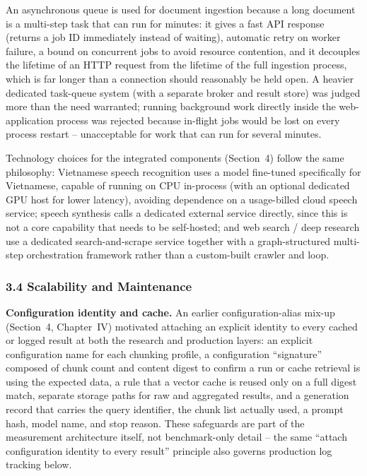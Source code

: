 \documentclass[11pt,a4paper]{article}
\begin{document}
An asynchronous queue is used for document ingestion because a long
document is a multi-step task that can run for minutes: it gives a fast API
response (returns a job ID immediately instead of waiting), automatic retry
on worker failure, a bound on concurrent jobs to avoid resource contention,
and it decouples the lifetime of an HTTP request from the lifetime of the
full ingestion process, which is far longer than a connection should
reasonably be held open. A heavier dedicated task-queue system (with a
separate broker and result store) was judged more than the need warranted;
running background work directly inside the web-application process was
rejected because in-flight jobs would be lost on every process restart --
unacceptable for work that can run for several minutes.

Technology choices for the integrated components (Section~4) follow the
same philosophy: Vietnamese speech recognition uses a model fine-tuned
specifically for Vietnamese, capable of running on CPU in-process (with an
optional dedicated GPU host for lower latency), avoiding dependence on a
usage-billed cloud speech service; speech synthesis calls a dedicated
external service directly, since this is not a core capability that needs
to be self-hosted; and web search / deep research use a dedicated
search-and-scrape service together with a graph-structured multi-step
orchestration framework rather than a custom-built crawler and loop.

\subsubsection{3.4 Scalability and Maintenance}

\textbf{Configuration identity and cache.} An earlier configuration-alias
mix-up (Section~4, Chapter~IV) motivated attaching an explicit identity to
every cached or logged result at both the research and production layers:
an explicit configuration name for each chunking profile, a configuration
``signature'' composed of chunk count and content digest to confirm a run or
cache retrieval is using the expected data, a rule that a vector cache is
reused only on a full digest match, separate storage paths for raw and
aggregated results, and a generation record that carries the query
identifier, the chunk list actually used, a prompt hash, model name, and
stop reason. These safeguards are part of the measurement architecture
itself, not benchmark-only detail -- the same ``attach configuration identity
to every result'' principle also governs production log tracking below.
\end{document}
